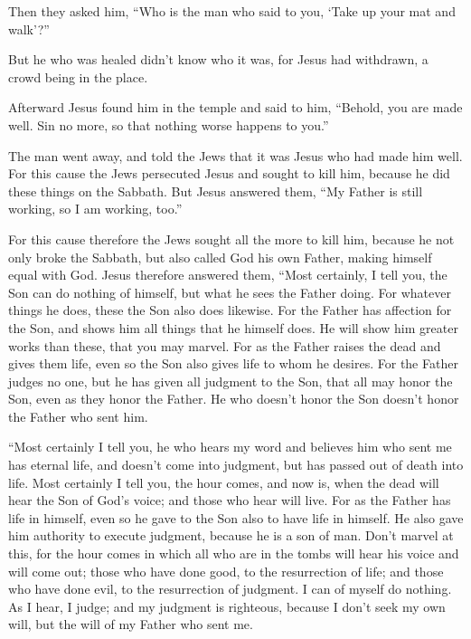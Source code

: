  Then they asked him, ``Who is the man who said to you,
`Take up your mat and walk'?''

 But he who was healed didn't know who it was, for Jesus
had withdrawn, a crowd being in the place.

 Afterward Jesus found him in the temple and said to him,
``Behold, you are made well. Sin no more, so that nothing worse happens
to you.''

 The man went away, and told the Jews that it was Jesus
who had made him well.  For this cause the Jews
persecuted Jesus and sought to kill him, because he did these things on
the Sabbath.  But Jesus answered them, ``My Father is
still working, so I am working, too.''

 For this cause therefore the Jews sought all the more to
kill him, because he not only broke the Sabbath, but also called God his
own Father, making himself equal with God.  Jesus
therefore answered them, ``Most certainly, I tell you, the Son can do
nothing of himself, but what he sees the Father doing. For whatever
things he does, these the Son also does likewise.  For
the Father has affection for the Son, and shows him all things that he
himself does. He will show him greater works than these, that you may
marvel.  For as the Father raises the dead and gives them
life, even so the Son also gives life to whom he desires.
 For the Father judges no one, but he has given all
judgment to the Son,  that all may honor the Son, even as
they honor the Father. He who doesn't honor the Son doesn't honor the
Father who sent him.

 ``Most certainly I tell you, he who hears my word and
believes him who sent me has eternal life, and doesn't come into
judgment, but has passed out of death into life.  Most
certainly I tell you, the hour comes, and now is, when the dead will
hear the Son of God's voice; and those who hear will live.
 For as the Father has life in himself, even so he gave
to the Son also to have life in himself.  He also gave
him authority to execute judgment, because he is a son of man.
 Don't marvel at this, for the hour comes in which all
who are in the tombs will hear his voice  and will come
out; those who have done good, to the resurrection of life; and those
who have done evil, to the resurrection of judgment.  I
can of myself do nothing. As I hear, I judge; and my judgment is
righteous, because I don't seek my own will, but the will of my Father
who sent me.

